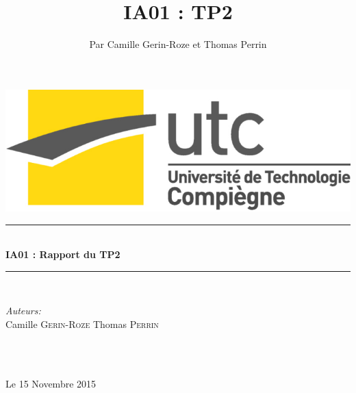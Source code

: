 \documentclass[a4paper,10pt]{report}
\title{IA01 : TP2}
\author{Par Camille Gerin-Roze et Thomas Perrin}
\begin{document}
\begin{titlepage}

\begin{flushright}
  \includegraphics[scale = 0.2]{logo_utc.jpg}
\end{flushright}
\vspace*{5cm}

\newcommand{\HRule}{\rule{\linewidth}{0.5mm}} %
\center %
 



\HRule \\[0.4cm]
{ \LARGE \bfseries  IA01 : Rapport du TP2}\\[0.4cm] %
\HRule \\[1.5cm]
 
\begin{minipage}{0.4\textwidth}
\begin{flushleft} \large
\emph{Auteurs:}\\
Camille \textsc{Gerin-Roze} \newline
Thomas \textsc{Perrin} 
\end{flushleft}
\end{minipage}
~
\begin{minipage}{0.4\textwidth}

\end{minipage}\\[1.3cm]


{\large Le 15 Novembre 2015} %

\end{titlepage}
\tableofcontents
\end{document}
